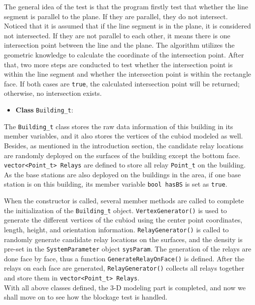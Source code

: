 \documentclass[paper=a4, fontsize=11pt]{scrartcl}
\numberwithin{equation}{section}		%
\numberwithin{figure}{section}			%
\numberwithin{table}{section}				%
\begin{document}
The general idea of the test is that the program firstly test that whether the line segment is parallel to the plane. If they are parallel, they do not intersect. Noticed that it is assumed that if the line segment is in the plane, it is considered not intersected. If they are not parallel to each other, it means there is one intersection point between the line and the plane. The algorithm utilizes the geometric knowledge to calculate the coordinate of the intersection point. After that, two more steps are conducted to test whether the intersection point is within the line segment and whether the intersection point is within the rectangle face. If both cases are \verb|true|, the calculated intersection point will be returned; otherwise, no intersection exists.

\begin{itemize}
	\item \textbf{Class} \verb|Building_t|:
\end{itemize}

The \verb|Building_t| class stores the raw data information of this building in its member variables, and it also stores the vertices of the cubiod modeled as well. Besides, as mentioned in the introduction section, the candidate relay locations are randomly deployed on the surfaces of the building except the bottom face. \verb|vector<Point_t> Relays| are defined to store all relay \verb|Point_t| on the building. As the base stations are also deployed on the buildings in the area, if one base station is on this building, its member variable \verb|bool hasBS| is set as \verb|true|.

When the constructor is called, several member methods are called to complete the initialization of the \verb|Building_t| object. \verb|VertexGenerator()| is used to generate the different vertices of the cubiod using the center point coordinates, length, height, and orientation information. \verb|RelayGenerator()| is called to randomly generate candidate relay locations on the surfaces, and the density is pre-set in the \verb|SystemParameter| object \verb|sysParam|. The generation of the relays are done face by face, thus a function \verb|GenerateRelayOnFace()| is defined. After the relays on each face are generated, \verb|RelayGenerator()| collects all relays together and store them in \verb|vector<Point_t> Relays|.\\

With all above classes defined, the 3-D modeling part is completed, and now we shall move on to see how the blockage test is handled.
\end{document}
